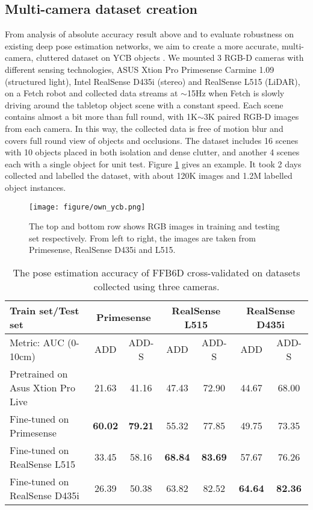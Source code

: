 \subsection{Multi-camera dataset creation}
From analysis of absolute accuracy result above and to evaluate robustness on existing deep pose estimation networks, we aim to create a more accurate, multi-camera, cluttered dataset on YCB objects \cite{calli2015ycb}. We mounted 3 RGB-D cameras with different sensing technologies, ASUS Xtion Pro Primesense Carmine 1.09 (structured light), Intel RealSense D435i (stereo) and RealSense L515 (LiDAR), on a Fetch robot and collected data streams at $\sim$15Hz when Fetch is slowly driving around the tabletop object scene with a constant speed. Each scene contains almost a bit more than full round, with 1K$\sim$3K paired RGB-D images from each camera. In this way, the collected data is free of motion blur and covers full round view of objects and occlusions. The dataset includes 16 scenes with 10 objects placed in both isolation and dense clutter, and another 4 scenes each with a single object for unit test. Figure \ref{fig:dataset} gives an example. It took 2 days collected and labelled the dataset, with about 120K images and 1.2M labelled object instances.

 \begin{figure}[htbp]
     \centering
     \texttt{[image: figure/own\_ycb.png]}
     \caption{The top and bottom row shows RGB images in training and testing set respectively. From left to right, the images are taken from Primesense, RealSense D435i and L515.}
     \label{fig:dataset}
 \end{figure}


 \begin{table*}
   \centering
\small
   \begin{tabular}{@{}lcccccc@{}}
%  
     \toprule
     Train set/Test set & \multicolumn{2}{c}{Primesense} & \multicolumn{2}{c}{RealSense L515} & \multicolumn{2}{c}{RealSense D435i} \\
     \midrule
     Metric: AUC (0-10cm)& ADD & ADD-S & ADD & ADD-S & ADD & ADD-S \\
     \midrule
     Pretrained on Asus Xtion Pro Live & 21.63 & 41.16 & 47.43& 72.90 & 44.67&	68.00\\
     Fine-tuned on Primesense &  \textbf{60.02} & 	\textbf{79.21}& 55.32 & 77.85 & 49.75 & 73.35\\
     Fine-tuned on RealSense L515 & 33.45 &	58.16 & \textbf{68.84} &\textbf{83.69}  & 57.67 & 76.26\\
     Fine-tuned on RealSense D435i & 26.39 & 50.38 & 63.82& 82.52 & \textbf{64.64}	&\textbf{82.36}\\
     \bottomrule
   \end{tabular}
   \caption{The pose estimation accuracy of FFB6D cross-validated on datasets collected using three cameras.}
   \label{tab:add}
 \end{table*}

